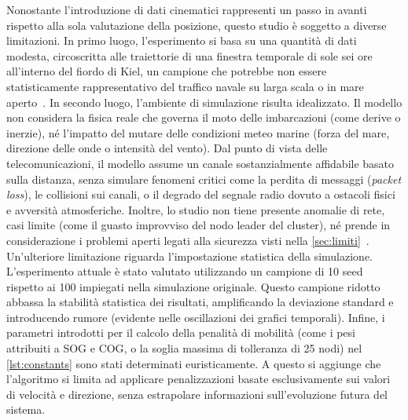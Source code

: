 Nonostante l'introduzione di dati cinematici rappresenti un passo in avanti rispetto alla sola valutazione della posizione, questo studio è soggetto a diverse limitazioni. In primo luogo, l'esperimento si basa su una quantità di dati modesta, circoscritta alle traiettorie di una finestra temporale di sole sei ore all'interno del fiordo di Kiel, un campione che potrebbe non essere statisticamente rappresentativo del traffico navale su larga scala o in mare aperto~\cite{11217861}. In secondo luogo, l'ambiente di simulazione risulta idealizzato. Il modello non considera la fisica reale che governa il moto delle imbarcazioni (come derive o inerzie), né l'impatto del mutare delle condizioni meteo marine (forza del mare, direzione delle onde o intensità del vento). Dal punto di vista delle telecomunicazioni, il modello assume un canale sostanzialmente affidabile basato sulla distanza, senza simulare fenomeni critici come la perdita di messaggi (\emph{packet loss}), le collisioni sui canali, o il degrado del segnale radio dovuto a ostacoli fisici e avversità atmosferiche. Inoltre, lo studio non tiene presente anomalie di rete, casi limite (come il guasto improvviso del nodo leader del cluster), né prende in considerazione i problemi aperti legati alla sicurezza visti nella \cref{sec:limiti}~\cite{11217861, 10.1145/2664243.2664257}. Un'ulteriore limitazione riguarda l'impostazione statistica della simulazione. L'esperimento attuale è stato valutato utilizzando un campione di 10 seed rispetto ai 100 impiegati nella simulazione originale. Questo campione ridotto abbassa la stabilità statistica dei risultati, amplificando la deviazione standard e introducendo rumore (evidente nelle oscillazioni dei grafici temporali). Infine, i parametri introdotti per il calcolo della penalità di mobilità (come i pesi attribuiti a \ac{SOG} e \ac{COG}, o la soglia massima di tolleranza di 25 nodi) nel \cref{lst:constants} sono stati determinati euristicamente. A questo si aggiunge che l'algoritmo si limita ad applicare penalizzazioni basate esclusivamente sui valori di velocità e direzione, senza estrapolare informazioni sull'evoluzione futura del sistema.

